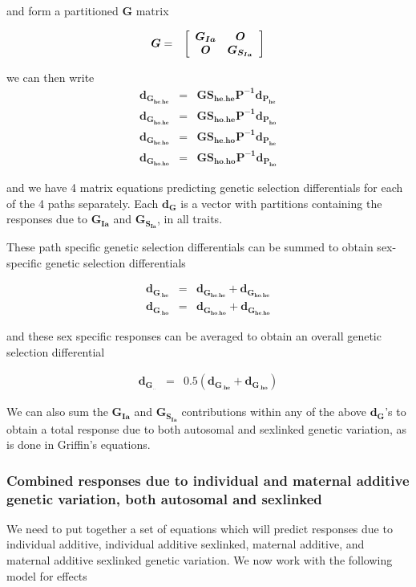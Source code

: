 \documentclass[titlepage]{article}  %
\begin{document}
and form a partitioned $\bm{G}$ matrix

\begin{eqnarray*}
\bm{G} & = &
\left[ \begin{array}{c c}
 \bm{G_{Ia}} & \bm{O} \\
 \bm{O} & \bm{G_{S_{Ia}}}
\end{array} \right]
\end{eqnarray*}

we can then write
\begin{eqnarray}
\label{eq.sexlin1}
\bm{d_{G_{he.he}}} & = & \bm{G S_{he.he} P^{-1} d_{P_{he}}} \nonumber \\
\bm{d_{G_{ho.he}}} & = & \bm{G S_{ho.he} P^{-1} d_{P_{ho}}} \nonumber \\
\bm{d_{G_{he.ho}}} & = & \bm{G S_{he.ho} P^{-1} d_{P_{he}}} \nonumber \\
\bm{d_{G_{ho.ho}}} & = & \bm{G S_{ho.ho} P^{-1} d_{P_{ho}}}
\end{eqnarray}

and we have 4 matrix equations predicting genetic selection differentials for each of the 4 paths separately. Each $\bm{d_{G}}$ is a vector with partitions containing the responses due to $\bm{G_{Ia}}$ and $\bm{G_{S_{Ia}}}$, in all traits.

These path specific genetic selection differentials can be summed to obtain sex-specific genetic selection differentials

\begin{eqnarray}
\label{eq.sexlin2}
\bm{d_{G_{.he}}} & = & \bm{d_{G_{he.he}} + d_{G_{ho.he}}} \nonumber \\
\bm{d_{G_{.ho}}} & = & \bm{d_{G_{ho.ho}} + d_{G_{he.ho}}}
\end{eqnarray}

and these sex specific responses can be averaged to obtain an overall genetic selection differential

\begin{eqnarray}
\label{eq.sexlin3}
\bm{d_{G_{..}}} & = & 0.5 (\bm{d_{G_{.he}} + d_{G_{.ho}}} )
\end{eqnarray}
 
We can also sum the $\bm{G_{Ia}}$ and $\bm{G_{S_{Ia}}}$ contributions within any of the above $\bm{d_{G}}$'s to obtain a total response due to both autosomal and sexlinked genetic variation, as is done in Griffin's equations.



\subsubsection{Combined responses due to individual and maternal additive genetic variation, both autosomal and sexlinked}
 We need to put together a set of equations which will predict responses due to individual additive, individual additive sexlinked, maternal additive, and maternal additive sexlinked genetic variation. We now work with the following model for effects
\end{document}
